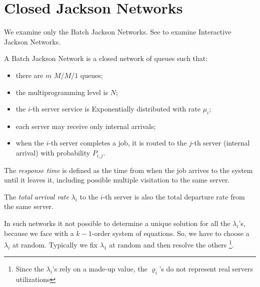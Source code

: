 \section{Closed Jackson Networks}
\label{sec:Closed-Jackson-Networks}

We examine only the Batch Jackson Networks. 
See \cite{harchol2013performance} to examine Interactive Jackson Networks.

\begin{definition}
	\label{def:Batch-Jackson-Network}
	A Batch Jackson Network is a closed network of queues such that:
	
	\begin{itemize}
		\item there are $m$ $M/M/1$ queues;
		\item the multiprogramming level is $N$;
		\item the $i$-th server service is Exponentially distributed with rate $\mu_{i}$;
		\item each server may receive only internal arrivals;
		\item when the $i$-th server completes a job, it is routed to the $j$-th server (internal arrival) with probability $P_{i,j}$.
	\end{itemize}
\end{definition}


The \textit{response time} is defined as the time from when the job arrives to the system until it leaves it, including possible multiple visitation to the same server.

The \textit{total arrival rate} $\lambda_{i}$ to the $i$-th server is also the total departure rate from the same server.

In such networks it not possible to determine a unique solution for all the $\lambda_{i}$'s, because we face with a $k-1$-order system of equations. So, we have to choose a $\lambda_{i}$ at random. Typically we fix $\lambda_{1}$ at random and then resolve the others \footnote{Since the $\lambda_{i}$'s rely on a made-up value, the $\varrho_{i}$'s do not represent real servers utilizations}.

